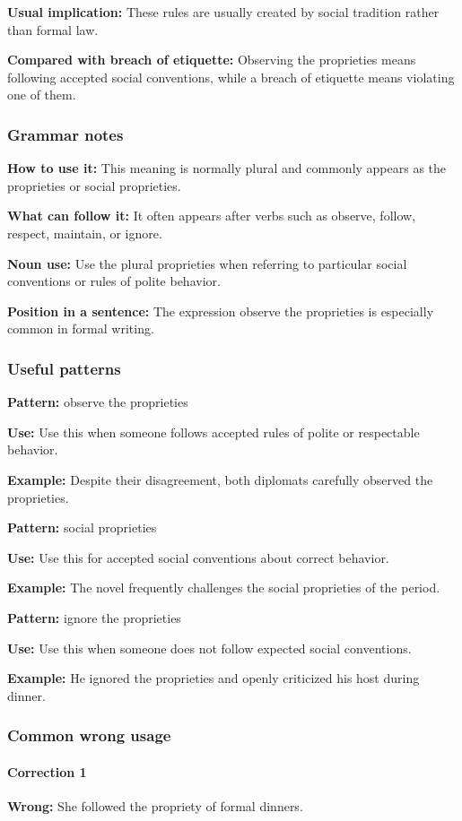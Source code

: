 \documentclass[11pt]{article}
\begin{document}
\textbf{Usual implication:} These rules are usually created by social tradition rather than formal law.

\textbf{Compared with breach of etiquette:} Observing the proprieties means following accepted social conventions, while a breach of etiquette means violating one of them.

\subsubsection{Grammar notes}
\textbf{How to use it:} This meaning is normally plural and commonly appears as the proprieties or social proprieties.

\textbf{What can follow it:} It often appears after verbs such as observe, follow, respect, maintain, or ignore.

\textbf{Noun use:} Use the plural proprieties when referring to particular social conventions or rules of polite behavior.

\textbf{Position in a sentence:} The expression observe the proprieties is especially common in formal writing.

\subsubsection{Useful patterns}
\textbf{Pattern:} observe the proprieties

\textbf{Use:} Use this when someone follows accepted rules of polite or respectable behavior.

\textbf{Example:} Despite their disagreement, both diplomats carefully observed the proprieties.

\textbf{Pattern:} social proprieties

\textbf{Use:} Use this for accepted social conventions about correct behavior.

\textbf{Example:} The novel frequently challenges the social proprieties of the period.

\textbf{Pattern:} ignore the proprieties

\textbf{Use:} Use this when someone does not follow expected social conventions.

\textbf{Example:} He ignored the proprieties and openly criticized his host during dinner.

\subsubsection{Common wrong usage}
\paragraph{Correction 1}
\textbf{Wrong:} She followed the propriety of formal dinners.
\end{document}
